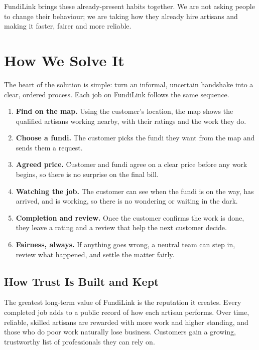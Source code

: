 \documentclass[11pt,a4paper]{article}
\begin{document}
FundiLink brings these already-present habits together. We are not asking people to change
their behaviour; we are taking how they already hire artisans and making it faster, fairer and
more reliable.

\section{How We Solve It}

The heart of the solution is simple: turn an informal, uncertain handshake into a clear,
ordered process. Each job on FundiLink follows the same sequence.

\begin{enumerate}[leftmargin=1.5em]
    \item \textbf{Find on the map.} Using the customer's location, the map shows the qualified
          artisans working nearby, with their ratings and the work they do.
    \item \textbf{Choose a fundi.} The customer picks the fundi they want from the map and
          sends them a request.
    \item \textbf{Agreed price.} Customer and fundi agree on a clear price before any work
          begins, so there is no surprise on the final bill.
    \item \textbf{Watching the job.} The customer can see when the fundi is on the way, has
          arrived, and is working, so there is no wondering or waiting in the dark.
    \item \textbf{Completion and review.} Once the customer confirms the work is done, they
          leave a rating and a review that help the next customer decide.
    \item \textbf{Fairness, always.} If anything goes wrong, a neutral team can step in, review
          what happened, and settle the matter fairly.
\end{enumerate}

\subsection{How Trust Is Built and Kept}

The greatest long-term value of FundiLink is the reputation it creates. Every completed job
adds to a public record of how each artisan performs. Over time, reliable, skilled artisans
are rewarded with more work and higher standing, and those who do poor work naturally lose
business. Customers gain a growing, trustworthy list of professionals they can rely on.
\end{document}
